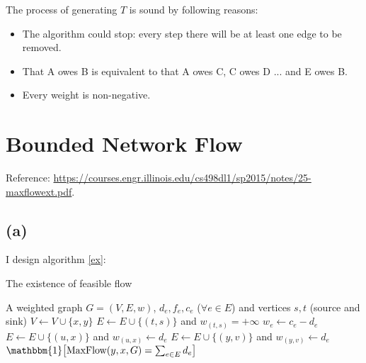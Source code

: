 \documentclass{article}
\begin{document}
The process of generating  $T$ is sound by following reasons:
\begin{itemize}
	\item
	      The algorithm could stop: every step there will be at least one edge to be removed.
	\item
	      That A owes B is equivalent to that A owes C, C owes D ... and E owes B.
	\item
	      Every weight is non-negative.
\end{itemize}
\clearpage
\section{Bounded Network Flow}
Reference: \href{https://courses.engr.illinois.edu/cs498dl1/sp2015/notes/25-maxflowext.pdf}{https://courses.engr.illinois.edu/cs498dl1/sp2015/notes/25-maxflowext.pdf}.
\subsection*{(a)}
I design algorithm \ref{ex}:

\begin{algorithm}[htbp]
	\caption{The existence of feasible flow}
	\label{ex}
	\begin{algorithmic}[1]
		\renewcommand{\algorithmicrequire}{\textbf{Input:}}
		\renewcommand{\algorithmicensure}{\textbf{Output:}}
		\renewcommand{\algorithmiccomment}[1]{\hfill\textit{\textcolor{blue}{\##1}}}
		\REQUIRE A weighted graph $G=(V,E,w)$, $d_e,f_e,c_e$ ($\forall e\in E$) and vertices $s,t$ (source and sink)
		\STATE $V \gets V\cup\{x,y\}$
		\STATE $E\gets E\cup\{(t,s)\}$ and  $w_{(t,s)}=+\infty$
		\STATE $w_e\gets c_e-d_e$
		\STATE $E\gets E\cup\{(u,x)\}$ and $w_{(u,x)}\gets d_e$
		\STATE $E\gets E\cup\{(y,v)\}$ and $w_{(y,v)}\gets d_e$
		\ENDFOR
		\RETURN $\mathbbm{1}\qty[\mathrm{MaxFlow}(y,x,G)=\sum_{e\in E}d_e]$
	\end{algorithmic}
\end{algorithm}
\end{document}
